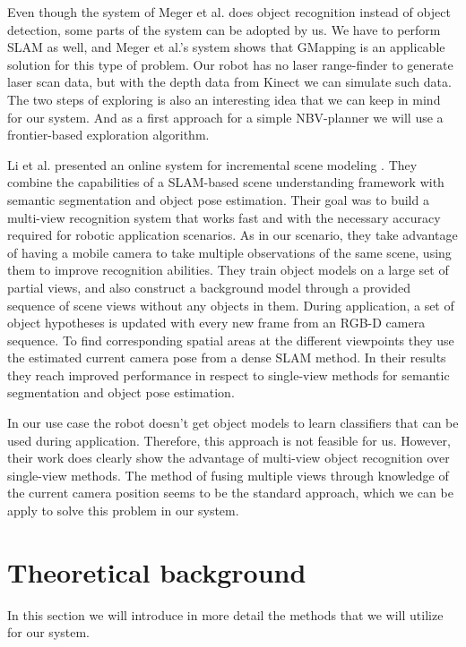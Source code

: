 \documentclass[a4paper,11pt,english]{article}
\begin{document}
Even though the system of Meger et al. does object recognition instead of object detection, some parts of the system can be adopted by us.
We have to perform SLAM as well, and Meger et al.'s system shows that GMapping is an applicable solution for this type of problem.
Our robot has no laser range-finder to generate laser scan data, but with the depth data from Kinect we can simulate such data.
The two steps of exploring is also an interesting idea that we can keep in mind for our system.
And as a first approach for a simple NBV-planner we will use a frontier-based exploration algorithm. \medskip

Li et al. presented an online system for incremental scene modeling \cite{li2016incremental}.
They combine the capabilities of a SLAM-based scene understanding framework with semantic segmentation and object pose estimation.
Their goal was to build a multi-view recognition system that works fast and with the necessary accuracy required for robotic application scenarios.
As in our scenario, they take advantage of having a mobile camera to take multiple observations of the same scene, using them to improve recognition abilities.
They train object models on a large set of partial views, and also construct a background model through a provided sequence of scene views without any objects in them.
During application, a set of object hypotheses is updated with every new frame from an RGB-D camera sequence.
To find corresponding spatial areas at the different viewpoints they use the estimated current camera pose from a dense SLAM method.
In their results they reach improved performance in respect to single-view methods for semantic segmentation and object pose estimation.

In our use case the robot doesn't get object models to learn classifiers that can be used during application.
Therefore, this approach is not feasible for us.
However, their work does clearly show the advantage of multi-view object recognition over single-view methods.
The method of fusing multiple views through knowledge of the current camera position seems to be the standard approach, which we can be apply to solve this problem in our system.

\section{Theoretical background}
\label{background}
In this section we will introduce in more detail the methods that we will utilize for our system.
\end{document}
